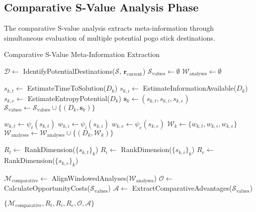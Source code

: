 \documentclass[12pt,a4paper]{article}
\begin{document}
\subsection{Comparative S-Value Analysis Phase}

The comparative S-value analysis extracts meta-information through simultaneous evaluation of multiple potential pogo stick destinations.

\begin{algorithm}[H]
\caption{Comparative S-Value Meta-Information Extraction}
\begin{algorithmic}[1]
    \State $\mathcal{D} \leftarrow$ IdentifyPotentialDestinations($\mathcal{S}$, $\mathbf{r}_{\text{current}}$)
    \State $\mathcal{S}_{\text{values}} \leftarrow \emptyset$ 
    \State $\mathcal{W}_{\text{analyses}} \leftarrow \emptyset$ 
    
     
        \State $s_{k,t} \leftarrow$ EstimateTimeToSolution($D_k$)
        \State $s_{k,i} \leftarrow$ EstimateInformationAvailable($D_k$)  
        \State $s_{k,e} \leftarrow$ EstimateEntropyPotential($D_k$)
        \State $\mathbf{s}_k \leftarrow (s_{k,t}, s_{k,i}, s_{k,e})$
        \State $\mathcal{S}_{\text{values}} \leftarrow \mathcal{S}_{\text{values}} \cup \{(D_k, \mathbf{s}_k)\}$
        
        \State $w_{k,t} \leftarrow \psi_t(s_{k,t})$ 
        \State $w_{k,i} \leftarrow \psi_i(s_{k,i})$
        \State $w_{k,e} \leftarrow \psi_e(s_{k,e})$
        \State $\mathcal{W}_k \leftarrow \{w_{k,t}, w_{k,i}, w_{k,e}\}$
        \State $\mathcal{W}_{\text{analyses}} \leftarrow \mathcal{W}_{\text{analyses}} \cup \{(D_k, \mathcal{W}_k)\}$
    \EndFor
    
    \State $R_t \leftarrow$ RankDimension($\{s_{k,t}\}_{k}$) 
    \State $R_i \leftarrow$ RankDimension($\{s_{k,i}\}_{k}$)
    \State $R_e \leftarrow$ RankDimension($\{s_{k,e}\}_{k}$)
    
    \State $\mathcal{M}_{\text{comparative}} \leftarrow$ AlignWindowedAnalyses($\mathcal{W}_{\text{analyses}}$)
    \State $\mathcal{O} \leftarrow$ CalculateOpportunityCosts($\mathcal{S}_{\text{values}}$)
    \State $\mathcal{A} \leftarrow$ ExtractComparativeAdvantages($\mathcal{S}_{\text{values}}$)
    
    \State \Return $\{\mathcal{M}_{\text{comparative}}, R_t, R_i, R_e, \mathcal{O}, \mathcal{A}\}$
\EndProcedure
\end{algorithmic}
\end{algorithm}
\end{document}
